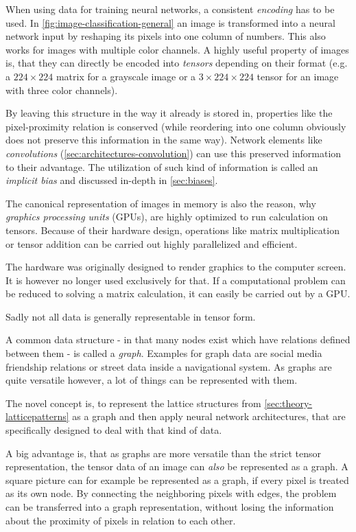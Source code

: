 When using data for training neural networks, a consistent \emph{encoding} has to be used.
In \autoref{fig:image-classification-general} an image is transformed into a neural network input by reshaping its pixels into one column of numbers. This also works for images with multiple color channels.
A highly useful property of images is, that they can directly be encoded into \emph{tensors} depending on their format (e.g. a $224\times224$ matrix for a grayscale image or a $3\times224\times224$ tensor for an image with three color channels).

By leaving this structure in the way it already is stored in, properties like the pixel-proximity relation is conserved (while reordering into one column obviously does not preserve this information in the same way).
Network elements like \emph{convolutions} (\autoref{sec:architectures-convolution}) can use this preserved information to their advantage. 
The utilization of such kind of information is called an \emph{implicit bias} and discussed in-depth in \autoref{sec:biases}.

The canonical representation of images in memory is also the reason, why \emph{graphics processing units} (GPUs), are highly optimized to run calculation on tensors.
Because of their hardware design, operations like matrix multiplication or tensor addition can be carried out highly parallelized and efficient.

The hardware was originally designed to render graphics to the computer screen. 
It is however no longer used exclusively for that.
If a computational problem can be reduced to solving a matrix calculation, it can easily be carried out by a GPU.

Sadly not all data is generally representable in tensor form. 

A common data structure - in that many nodes exist which have relations defined between them - is called a \emph{graph}.
Examples for graph data are social media friendship relations or street data inside a navigational system.
As graphs are quite versatile however, a lot of things can be represented with them.

The novel concept is, to represent the lattice structures from \autoref{sec:theory-latticepatterns} as a graph and then apply neural network architectures, that are specifically designed to deal with that kind of data.

A big advantage is, that as graphs are more versatile than the strict tensor representation, the tensor data of an image can \emph{also} be represented as a graph. 
A square picture can for example be represented as a graph, if every pixel is treated as its own node. 
By connecting the neighboring pixels with edges, the problem can be transferred into a graph representation, without losing the information about the proximity of pixels in relation to each other.

